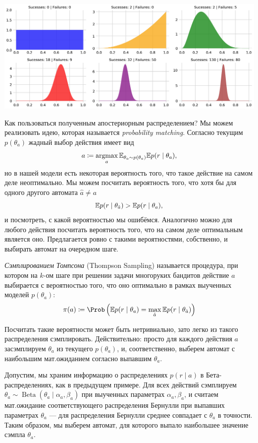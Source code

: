 \begin{example}
\begin{center}
    \includegraphics[width=\textwidth]{Images/TS}
\end{center}
\end{example}

Как пользоваться полученным апостериорным распределением? Мы можем реализовать идею, которая называется \emph{probability matching}. Согласно текущим $p(\theta_a)$ жадный выбор действия имеет вид
$$a \HM\coloneqq \argmax_a \E_{\theta_a \sim p(\theta_a)} \E p(r \mid \theta_a),$$
но в нашей модели есть некоторая вероятность того, что такое действие на самом деле неоптимально. Мы можем посчитать вероятность того, что хотя бы для одного другого автомата $\hat{a} \ne a$
$$\mathbb{E} p(r \mid \theta_{\hat{a}}) > \mathbb{E} p(r \mid \theta_{a}),$$
и посмотреть, с какой вероятностью мы ошибёмся. Аналогично можно для любого действия посчитать вероятность того, что на самом деле оптимальным является оно. Предлагается ровно с такими вероятностями, собственно, и выбирать автомат на очередном шаге.

\begin{definition}
\emph{Сэмплированием Томпсона} (Thompson Sampling) называется процедура, при котором на $k$-ом шаге при решении задачи многоруких бандитов действие $a$ выбирается с вероятностью того, что оно оптимально в рамках выученных моделей $p(\theta_a)$:
$$\pi(a) \coloneqq \Prob \left( \E p(r \mid \theta_a) = \max_{\hat{a}} \E p(r \mid \theta_{\hat{a}}) \right)$$
\end{definition}

Посчитать такие вероятности может быть нетривиально, зато легко из такого распределения сэмплировать. Действительно: просто для каждого действия $a$ засэмплируем $\theta_a$ из текущего $p(\theta_a)$, и, соответственно, выберем автомат с наибольшим мат.ожиданием согласно выпавшим $\theta_a$. 

\begin{example}
Допустим, мы храним информацию о распределениях $p(r \mid a)$ в Бета-распределениях, как в предыдущем примере. Для всех действий сэмплируем $\theta_a \sim \operatorname{Beta}(\theta_a \mid \alpha_a, \beta_a)$ при выученных параметрах $\alpha_a, \beta_a$, и считаем мат.ожидание соответствующего распределения Бернулли при выпавших параметрах $\theta_a$ --- для распределения Бернулли среднее совпадает с $\theta_a$ в точности. Таким образом, мы выберем автомат, для которого выпало наибольшее значение сэмпла $\theta_a$.
\end{example}

